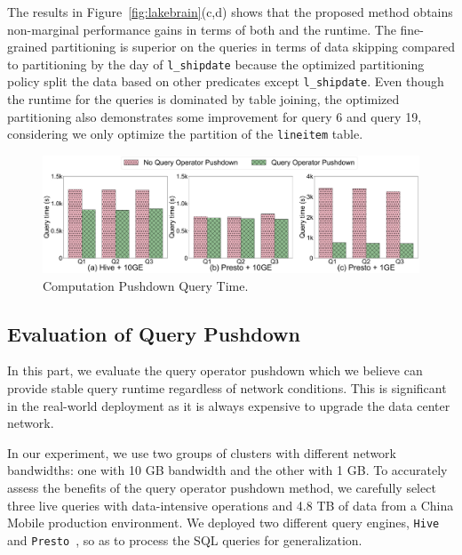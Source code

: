 The results  in Figure~\ref{fig:lakebrain}(c,d) shows that the proposed method obtains non-marginal performance gains in terms of both  and the runtime. The fine-grained partitioning is superior on the queries in terms of data skipping compared to partitioning by the day of \texttt{l\_shipdate} because the optimized partitioning policy split the data based on other predicates except \texttt{l\_shipdate}. Even though the runtime for the queries is dominated by table joining, the optimized partitioning also demonstrates some improvement for query 6 and query 19, considering we only optimize the partition of the \texttt{lineitem} table. 



\begin{figure}
	\centering
	\includegraphics[width=\columnwidth]{figures/Querytime}
	\vspace{-2em}
	\caption{Computation Pushdown Query Time.}
	\label{fig:pushdown}
	\vspace{-2.1em}
\end{figure}



\subsection{Evaluation of Query Pushdown}
In this part, we evaluate the query operator pushdown  which we believe can provide stable query runtime regardless of network conditions. This is significant in the real-world deployment as it is  always expensive to upgrade the data center network. 




In our experiment, we use two groups of clusters with different network bandwidths: one with 10 GB bandwidth and the other with 1 GB. To accurately assess the benefits of the query operator pushdown method, we carefully select three live queries with data-intensive operations and 4.8 TB of data from a China Mobile production environment. We deployed two different query engines, \texttt{Hive}~\cite{hive} and \texttt{Presto}~\cite{presto}, so as to process the SQL queries for generalization.

